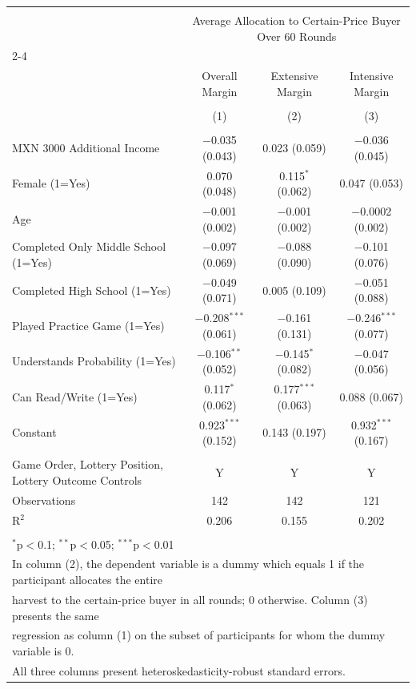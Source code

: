
\begin{table}[!htbp] \centering 
   
   
\begin{tabular}{@{\extracolsep{5pt}}lccc} 
\\[-1.8ex]\hline 
\hline \\[-1.8ex] 
 & \multicolumn{3}{c}{Average Allocation to Certain-Price Buyer Over 60 Rounds} \\ 
\cline{2-4} 
\\[-1.8ex] & Overall Margin & Extensive Margin & Intensive Margin \\ 
\\[-1.8ex] & (1) & (2) & (3)\\ 
\hline \\[-1.8ex] 
 MXN 3000 Additional Income & $-$0.035 (0.043) & 0.023 (0.059) & $-$0.036 (0.045) \\ 
  Female (1=Yes) & 0.070 (0.048) & 0.115$^{*}$ (0.062) & 0.047 (0.053) \\ 
  Age & $-$0.001 (0.002) & $-$0.001 (0.002) & $-$0.0002 (0.002) \\ 
  Completed Only Middle School (1=Yes) & $-$0.097 (0.069) & $-$0.088 (0.090) & $-$0.101 (0.076) \\ 
  Completed High School (1=Yes) & $-$0.049 (0.071) & 0.005 (0.109) & $-$0.051 (0.088) \\ 
  Played Practice Game (1=Yes) & $-$0.208$^{***}$ (0.061) & $-$0.161 (0.131) & $-$0.246$^{***}$ (0.077) \\ 
  Understands Probability (1=Yes) & $-$0.106$^{**}$ (0.052) & $-$0.145$^{*}$ (0.082) & $-$0.047 (0.056) \\ 
  Can Read/Write (1=Yes) & 0.117$^{*}$ (0.062) & 0.177$^{***}$ (0.063) & 0.088 (0.067) \\ 
  Constant & 0.923$^{***}$ (0.152) & 0.143 (0.197) & 0.932$^{***}$ (0.167) \\ 
 \hline \\[-1.8ex] 
Game Order, Lottery Position, Lottery Outcome Controls & Y & Y & Y \\ 
Observations & 142 & 142 & 121 \\ 
R$^{2}$ & 0.206 & 0.155 & 0.202 \\ 
\hline 
\hline \\[-1.8ex] 
\multicolumn{4}{l}{$^{*}$p$<$0.1; $^{**}$p$<$0.05; $^{***}$p$<$0.01} \\ 
\multicolumn{4}{l}{In column (2), the dependent variable is a dummy which equals 1 if the participant allocates the entire} \\ 
\multicolumn{4}{l}{harvest to the certain-price buyer in all rounds; 0 otherwise. Column (3) presents the same} \\ 
\multicolumn{4}{l}{regression as column (1) on the subset of participants for whom the dummy variable is 0.} \\ 
\multicolumn{4}{l}{All three columns present heteroskedasticity-robust standard errors.} \\ 
\end{tabular} 
\end{table} 
